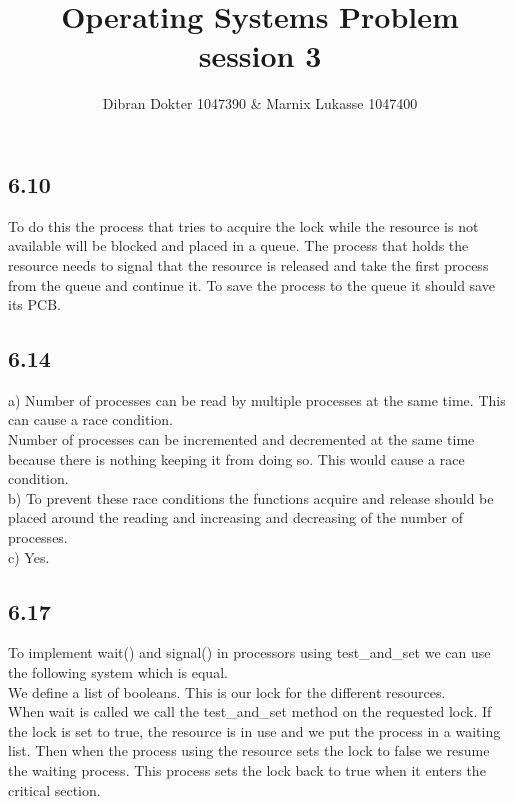 \documentclass[]{article}
\title{Operating Systems Problem session 3}
\author{Dibran Dokter 1047390 \& Marnix Lukasse 1047400}
\begin{document}
\maketitle

\subsection*{6.10}

To do this the process that tries to acquire the lock while the resource is not available will be blocked and placed in a queue. The process that holds the resource needs to signal that the resource is released and take the first process from the queue and continue it. To save the process to the queue it should save its PCB.

\subsection*{6.14}

a)
Number of processes can be read by multiple processes at the same time. This can cause a race condition.\\
Number of processes can be incremented and decremented at the same time because there is nothing keeping it from doing so. This would cause a race condition.\\

b)
To prevent these race conditions the functions acquire and release should be placed around the reading and increasing and decreasing of the number of processes.\\

c)
Yes.

\subsection*{6.17}

To implement wait() and signal() in processors using test\_and\_set we can use the following system which is equal.\\

We define a list of booleans. This is our lock for the different resources.\\

When wait is called we call the test\_and\_set method on the requested lock. If the lock is set to true, the resource is in use and we put the process in a waiting list. Then when the process using the resource sets the lock to false we resume the waiting process. This process sets the lock back to true when it enters the critical section.\\
\end{document}
